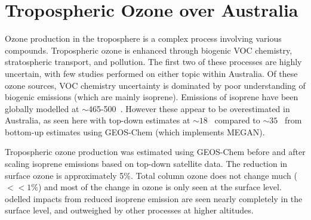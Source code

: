 \section{Tropospheric Ozone over Australia}
\label{Conclusions:ozone}
  
  
  Ozone production in the troposphere is a complex process involving various compounds.
  Tropospheric ozone is enhanced through biogenic VOC chemistry, stratospheric transport, and pollution.
  The first two of these processes are highly uncertain, with few studies performed on either topic within Australia.
  Of these ozone sources, VOC chemistry uncertainty is dominated by poor understanding of biogenic emissions (which are mainly isoprene).
  Emissions of isoprene have been globally modelled at $\sim$465-500\tgcpyr ~\parencite{Guenther2006, Messina2016}. 
  However these appear to be overestimated in Australia, as seen here with top-down estimates at $\sim 18$ \tgcpyr ~compared to $\sim 35$ \tgcpyr ~from bottom-up estimates using GEOS-Chem (which implements MEGAN).
  
  
  Tropospheric ozone production was estimated using GEOS-Chem before and after scaling isoprene emissions based on top-down satellite data.
  The reduction in surface ozone is approximately 5\%.
  Total column ozone does not change much ($<<1\%$) and most of the change in ozone is only seen at the surface level.
  odelled impacts from reduced isoprene emission are seen nearly completely in the surface level, and outweighed by other processes at higher altitudes.
  
  
